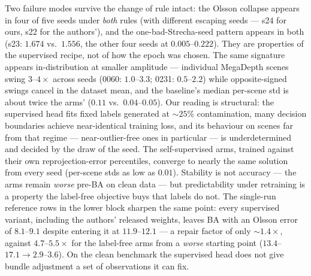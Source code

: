 \documentclass[10pt,twocolumn,letterpaper]{article}
\begin{document}
Two failure modes survive the change of rule intact: the Olsson collapse appears in four
of five seeds under \emph{both} rules (with different escaping seeds --- s24 for ours,
s22 for the authors'), and the one-bad-Strecha-seed pattern appears in both (s23:
$1.674$ vs.\ $1.556$, the other four seeds at $0.005$--$0.222$). They are properties of
the supervised recipe, not of how the epoch was chosen. The same signature
appears in-distribution at smaller amplitude --- individual MegaDepth scenes swing
$3$--$4\times$ across seeds (0060: $1.0$--$3.3$; 0231: $0.5$--$2.2$) while opposite-signed
swings cancel in the dataset mean, and the baseline's median per-scene std is about twice
the arms' ($0.11$ vs.\ $0.04$--$0.05$). Our reading is structural: the supervised head
fits fixed labels generated at ${\sim}25\%$ contamination, many decision boundaries
achieve near-identical training loss, and its behaviour on scenes far from that regime
--- near-outlier-free ones in particular --- is underdetermined and decided by the draw
of the seed. The self-supervised arms, trained against their own reprojection-error
percentiles, converge to nearly the same solution from every seed (per-scene stds as low
as $0.01$). Stability is not accuracy --- the arms remain \emph{worse} pre-BA on clean
data --- but predictability under retraining is a property the label-free objective buys
that labels do not. The single-run reference rows in the lower block
sharpen the same point: every supervised variant, including the authors' released
weights, leaves BA with an Olsson error of $8.1$--$9.1$ despite entering it at
$11.9$--$12.1$ --- a repair factor of only ${\sim}1.4\times$, against $4.7$--$5.5\times$
for the label-free arms from a \emph{worse} starting point ($13.4$--$17.1 \to
2.9$--$3.6$). On the clean benchmark the supervised head does not give bundle adjustment
a set of observations it can fix.
\end{document}
